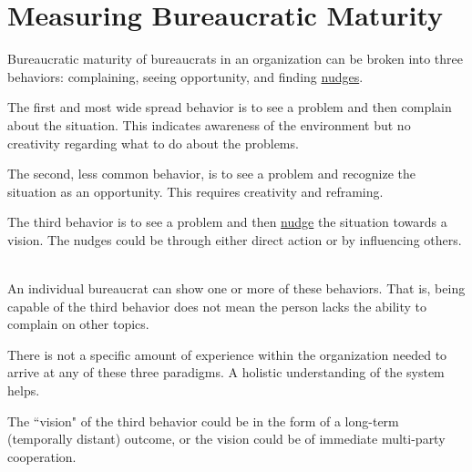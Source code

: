 \section{Measuring Bureaucratic Maturity}

Bureaucratic maturity of bureaucrats in an organization can be broken into three behaviors: complaining, seeing opportunity, and finding 
\href{https://en.wikipedia.org/wiki/Nudge_theory}{nudges}.

The first and most wide spread behavior is to see a problem and then complain about the situation. This indicates awareness of the environment but no creativity regarding what to do about the problems.

The second, less common behavior, is to see a problem and recognize the situation as an opportunity. This requires creativity and reframing. 

The third behavior is to see a problem and then \href{https://en.wikipedia.org/wiki/Nudge_theory}{nudge} 
the situation towards a vision. The nudges could be through either direct action or by influencing others. 


\ \\

An individual bureaucrat can show one or more of these behaviors. That is, being capable of the third behavior does not mean the person lacks the ability to complain on other topics. 

There is not a specific amount of experience within the organization needed to arrive at any of these three paradigms. A holistic understanding of the system helps.

The ``vision" of the third behavior could be in the form of a long-term (temporally distant) outcome, or the vision could be of immediate multi-party cooperation. 